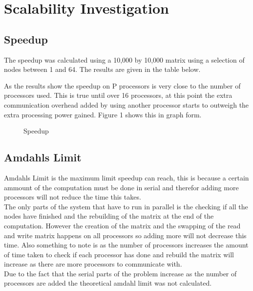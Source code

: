 \documentclass{article}
\begin{document}
\section{Scalability Investigation}

\subsection{Speedup}

The speedup was calculated using a 10,000 by 10,000 matrix using a selection of
nodes between 1 and 64. The results are given in the table below.

\begin{center}
\end{center}

As the results show the speedup on P processors is very close to the number of processors
used. This is true until over 16 processors, at this point the extra communication
overhead added by using another processor starts to outweigh the extra processing
power gained. Figure 1 shows this in graph form.

\begin{figure}[H]
 \centering
 \caption{Speedup}
 \label{fig:speedup}
 \end{figure}

\subsection{Amdahls Limit}

Amdahls Limit is the maximum limit speedup can reach, this is because a certain ammount
of the computation must be done in serial and therefor adding more processors will not
reduce the time this takes.\\
The only parts of the system that have to run in parallel is the checking if all the
nodes have finished and the rebuilding of the matrix at the end of the computation.
However the creation of the matrix and the swapping of the read and write matrix
happens on all processors so adding more will not decrease this time. Also something
to note is as the number of processors increases the amount of time taken to check
if each processor has done and rebuild the matrix will increase as there are more
processors to communicate with.\\
Due to the fact that the serial parts of the problem increase as the number of processors
are added the theoretical amdahl limit was not calculated.
\end{document}

